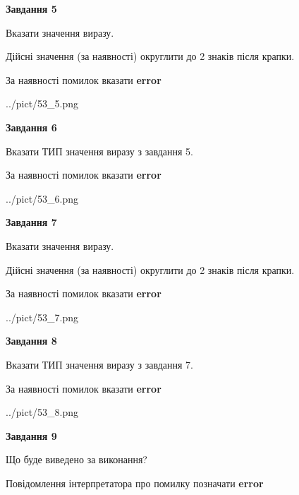 \documentclass[11pt, ukrainian]{article}
\begin{document}
{\begin {large}
{\begin {center}\textbf{Завдання 5}\end {center}}\par
Вказати значення виразу. \par
Дійсні значення (за наявності) округлити до 2 знаків після крапки. \par
За наявності помилок вказати \textbf{error}

\begin{center}
	{../pict/53_5.png}
\end{center}
\newpage

{\begin {center}\textbf{Завдання 6}\end {center}}\par
Вказати ТИП значення виразу з завдання 5. \par
За наявності помилок вказати \textbf{error}

\begin{center}
	{../pict/53_6.png}
\end{center}
\newpage

{\begin {center}\textbf{Завдання 7}\end {center}}\par
Вказати значення виразу. \par
Дійсні значення (за наявності) округлити до 2 знаків після крапки. \par
За наявності помилок вказати \textbf{error}

\begin{center}
	{../pict/53_7.png}
\end{center}
\newpage

{\begin {center}\textbf{Завдання 8}\end {center}}\par
Вказати ТИП значення виразу з завдання 7. \par
За наявності помилок вказати \textbf{error}

\begin{center}
	{../pict/53_8.png}
\end{center}
\newpage

{\begin {center}\textbf{Завдання 9}\end {center}}\par
Що буде виведено за виконання? \par
Повідомлення інтерпретатора про помилку позначати \textbf{error}


\end{large}}
\end{document}

